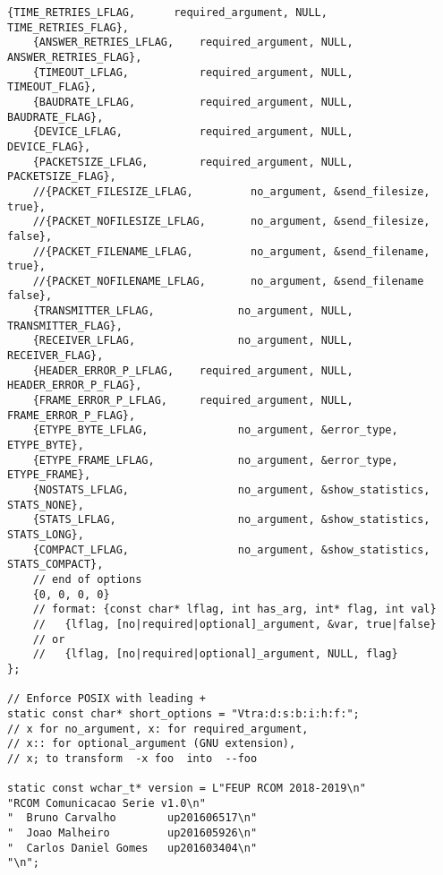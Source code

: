 \documentclass[subfiles]{main.tex}
\begin{document}
\begin{lstlisting}[style=rcom]
	{TIME_RETRIES_LFLAG,      required_argument, NULL,         TIME_RETRIES_FLAG},
	{ANSWER_RETRIES_LFLAG,    required_argument, NULL,       ANSWER_RETRIES_FLAG},
	{TIMEOUT_LFLAG,           required_argument, NULL,              TIMEOUT_FLAG},
	{BAUDRATE_LFLAG,          required_argument, NULL,             BAUDRATE_FLAG},
	{DEVICE_LFLAG,            required_argument, NULL,               DEVICE_FLAG},
	{PACKETSIZE_LFLAG,        required_argument, NULL,           PACKETSIZE_FLAG},
	//{PACKET_FILESIZE_LFLAG,         no_argument, &send_filesize,            true},
	//{PACKET_NOFILESIZE_LFLAG,       no_argument, &send_filesize,           false},
	//{PACKET_FILENAME_LFLAG,         no_argument, &send_filename,            true},
	//{PACKET_NOFILENAME_LFLAG,       no_argument, &send_filename            false},
	{TRANSMITTER_LFLAG,             no_argument, NULL,          TRANSMITTER_FLAG},
	{RECEIVER_LFLAG,                no_argument, NULL,             RECEIVER_FLAG},
	{HEADER_ERROR_P_LFLAG,    required_argument, NULL,       HEADER_ERROR_P_FLAG},
	{FRAME_ERROR_P_LFLAG,     required_argument, NULL,        FRAME_ERROR_P_FLAG},
	{ETYPE_BYTE_LFLAG,              no_argument, &error_type,         ETYPE_BYTE},
	{ETYPE_FRAME_LFLAG,             no_argument, &error_type,        ETYPE_FRAME},
	{NOSTATS_LFLAG,                 no_argument, &show_statistics,    STATS_NONE},
	{STATS_LFLAG,                   no_argument, &show_statistics,    STATS_LONG},
	{COMPACT_LFLAG,                 no_argument, &show_statistics, STATS_COMPACT},
	// end of options
	{0, 0, 0, 0}
	// format: {const char* lflag, int has_arg, int* flag, int val}
	//   {lflag, [no|required|optional]_argument, &var, true|false}
	// or
	//   {lflag, [no|required|optional]_argument, NULL, flag}
};

// Enforce POSIX with leading +
static const char* short_options = "Vtra:d:s:b:i:h:f:";
// x for no_argument, x: for required_argument,
// x:: for optional_argument (GNU extension),
// x; to transform  -x foo  into  --foo

static const wchar_t* version = L"FEUP RCOM 2018-2019\n"
"RCOM Comunicacao Serie v1.0\n"
"  Bruno Carvalho        up201606517\n"
"  Joao Malheiro         up201605926\n"
"  Carlos Daniel Gomes   up201603404\n"
"\n";


\end{lstlisting}
\end{document}
